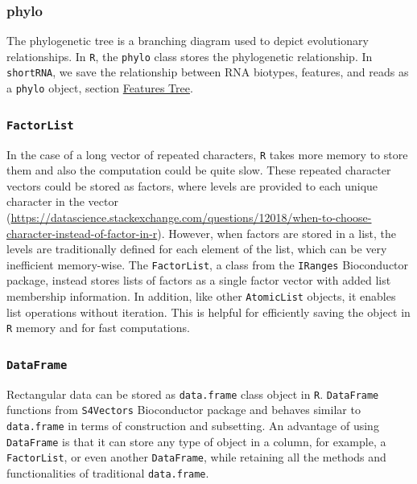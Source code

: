 \documentclass[12pt,twoside]{reedthesis}
\begin{document}
\hypertarget{phylo}{%
\subsubsection{phylo}\label{phylo}}

The phylogenetic tree is a branching diagram used to depict evolutionary
relationships. In \texttt{R}, the \texttt{phylo} class stores the phylogenetic
relationship. In \texttt{shortRNA}, we save the relationship between RNA
biotypes, features, and reads as a \texttt{phylo} object, section \protect\hyperlink{ft}{Features Tree}.

\hypertarget{factorlist}{%
\subsubsection{\texorpdfstring{\texttt{FactorList}}{FactorList}}\label{factorlist}}

In the case of a long vector of repeated characters, \texttt{R} takes more memory
to store them and also the computation could be quite slow. These
repeated character vectors could be stored as factors, where levels are
provided to each unique character in the vector
(\url{https://datascience.stackexchange.com/questions/12018/when-to-choose-character-instead-of-factor-in-r}).
However, when factors are stored in a list, the levels are traditionally
defined for each element of the list, which can be very inefficient
memory-wise. The \texttt{FactorList}, a class from the \texttt{IRanges} Bioconductor
package, instead stores lists of factors as a single factor vector with
added list membership information. In addition, like other \texttt{AtomicList}
objects, it enables list operations without iteration. This is helpful
for efficiently saving the object in \texttt{R} memory and for fast computations.

\hypertarget{dataframe}{%
\subsubsection{\texorpdfstring{\texttt{DataFrame}}{DataFrame}}\label{dataframe}}

Rectangular data can be stored as \texttt{data.frame} class object in \texttt{R}.
\texttt{DataFrame} functions from \texttt{S4Vectors} Bioconductor package and behaves
similar to \texttt{data.frame} in terms of construction and subsetting. An
advantage of using \texttt{DataFrame} is that it can store any type of object in
a column, for example, a \texttt{FactorList}, or even another \texttt{DataFrame}, while
retaining all the methods and functionalities of traditional
\texttt{data.frame}.
\end{document}
